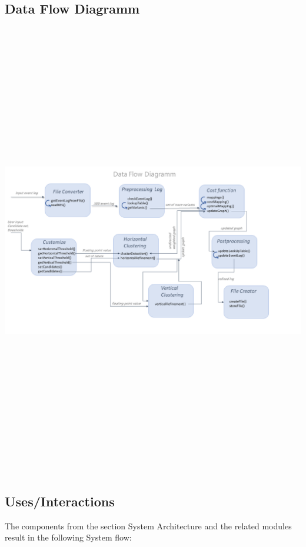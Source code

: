 \documentclass[notitlepage]{article}
\begin{document}
\begin{flushleft}
\subsection{Data Flow Diagramm}
\begin{landscape}
\includegraphics[width=270mm,height=200mm]{dataflow.png}
\restoregeometry
\end{landscape}

\subsection{Uses/Interactions}
The components from the section System Architecture and the related modules result in the following System flow:\\


\end{flushleft}
\end{document}
